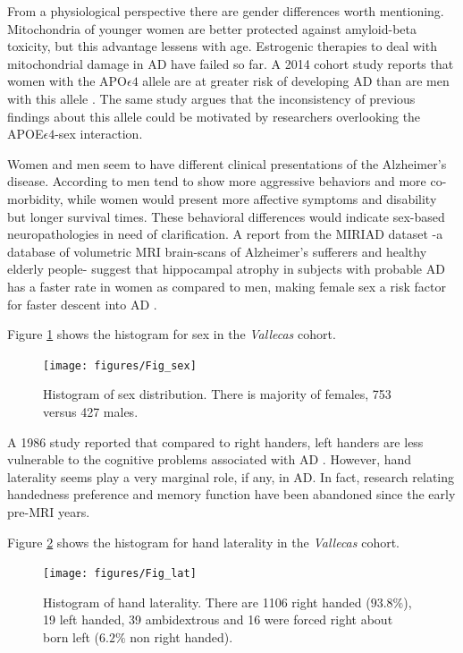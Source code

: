 \documentclass[11pt]{article}
\theoremstyle{definition}
\theoremstyle{remark}
\begin{document}
From a physiological perspective there are gender differences worth mentioning. Mitochondria of younger women are better protected against amyloid-beta toxicity, but this advantage lessens with age. Estrogenic therapies to deal with mitochondrial damage in AD have failed so far. A 2014 cohort study reports that women with the APO$\epsilon4$ allele are at greater risk of developing AD than are men with this allele \cite{altmann2014sex}. The same study argues that the inconsistency of previous findings about this allele could be motivated by researchers overlooking the APOE$\epsilon4$-sex interaction.

Women and men seem to have different clinical presentations of the Alzheimer's disease. According to \cite{sinforiani2010impact} men tend to show more aggressive behaviors and more co-morbidity, while women would present more affective symptoms and disability but longer survival times. These behavioral differences would indicate sex-based neuropathologies in need of clarification. A report from the MIRIAD dataset \cite{malone2013miriad} -a database of volumetric MRI brain-scans of Alzheimer's sufferers and healthy elderly people- suggest that hippocampal atrophy in subjects with probable AD has a faster rate in women as compared to men, making female sex a risk factor for faster descent into AD \cite{ardekani2016analysis}.

Figure \ref{fig:sex} shows the histogram for sex in the \emph{Vallecas} cohort.
\begin{figure}[H]
        \centering
        \texttt{[image: figures/Fig\_sex]}
        \caption{Histogram of sex distribution. There is majority of females, 753 versus 427 males. } 
        \label{fig:sex}
\end{figure}

A 1986 study reported that compared to right handers, left handers are less vulnerable to the cognitive problems associated with AD \cite{de1986reduced}. However, hand laterality seems play a very marginal role, if any, in AD. In fact, research relating handedness preference and memory function have been abandoned since the early pre-MRI years. 

Figure \ref{fig:lat} shows the histogram for hand laterality in the \emph{Vallecas} cohort.
\begin{figure}[H]
        \centering
        \texttt{[image: figures/Fig\_lat]}
        \caption{Histogram of hand laterality. There are 1106 right handed ($93.8\%$), 19 left handed, 39 ambidextrous and 16 were forced right about born left ($6.2\%$ non right handed).} 
        \label{fig:lat}
\end{figure}
\end{document}
